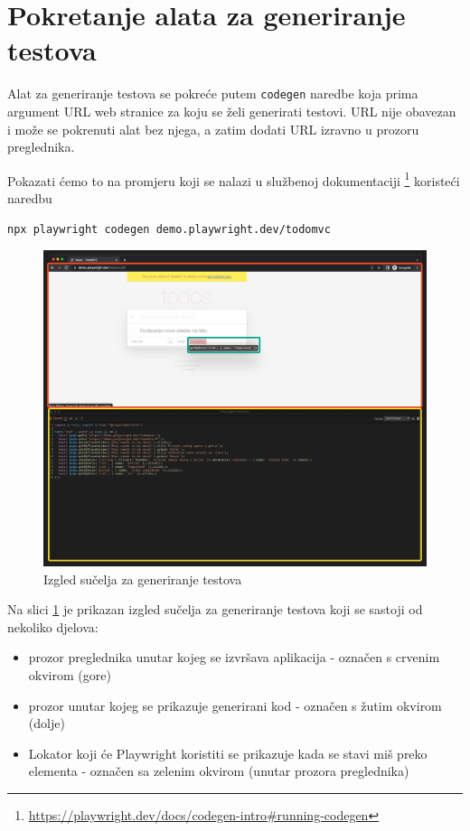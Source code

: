\section{Pokretanje alata za generiranje testova}

Alat za generiranje testova se pokreće putem \texttt{codegen} naredbe koja prima argument URL web stranice za koju se želi generirati testovi.
URL nije obavezan i može se pokrenuti alat bez njega, a zatim dodati URL izravno u prozoru preglednika.

Pokazati ćemo to na promjeru koji se nalazi u službenoj dokumentaciji \footnote{\url{https://playwright.dev/docs/codegen-intro\#running-codegen}} koristeći naredbu
\begin{verbatim}
npx playwright codegen demo.playwright.dev/todomvc
\end{verbatim}
\begin{figure}[!h]\begin{center}
    \includegraphics[width=1\textwidth]{"img/codegenInterface"}
    \caption{Izgled sučelja za generiranje testova}\label{img:pwCodeGen}
\end{center}\end{figure}

Na slici \ref{img:pwCodeGen} je prikazan izgled sučelja za generiranje testova koji se sastoji od nekoliko djelova:
\begin{itemize}
    \item prozor preglednika unutar kojeg se izvršava aplikacija - označen s crvenim okvirom (gore)
    \item prozor unutar kojeg se prikazuje generirani kod - označen s žutim okvirom (dolje)
    \item Lokator koji će Playwright koristiti se prikazuje kada se stavi miš preko elementa - označen sa zelenim okvirom (unutar prozora preglednika)
\end{itemize}


